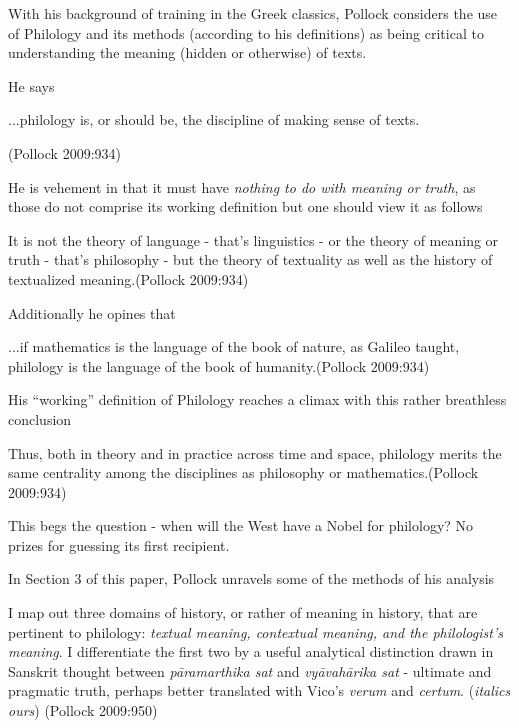 With his background of training in the Greek classics, Pollock considers the use of Philology and its methods (according to his definitions) as being critical to understanding the meaning (hidden or otherwise) of texts.

He says 
\begin{myquote}
...philology is, or should be, the discipline of making sense of texts.

\hfill (Pollock 2009:934)
\end{myquote}

He is vehement in that it must have {{\sl nothing to do with meaning or truth}\relax}, as those do not comprise its working definition but one should view it as follows
\begin{myquote}
It is not the theory of language - that's linguistics - or the theory of meaning or truth - that's philosophy - but the theory of textuality as well as the history of textualized meaning.\hfill (Pollock 2009:934)
\end{myquote}

Additionally he opines that
\begin{myquote}
...if mathematics is the language of the book of nature, as Galileo taught, philology is the language of the book of humanity.\hfill (Pollock 2009:934)
\end{myquote}

His ``working'' definition of Philology reaches a climax with this rather breathless conclusion
\begin{myquote}
Thus, both in theory and in practice across time and space, philology merits the same centrality among the disciplines as philosophy or mathematics.\hfill (Pollock 2009:934)
\end{myquote}

\newpage

This begs the question - when will the West have a Nobel for philology? No prizes for guessing its first recipient.

In Section 3 of this paper, Pollock unravels some of the methods of his analysis
\begin{myquote}
I map out three domains of history, or rather of meaning in history, that are pertinent to philology: {\sl textual meaning, contextual meaning, and the philologist's meaning}. I differentiate the first two by a useful analytical distinction drawn in Sanskrit thought between {\sl pāramarthika sat} and {\sl vyāvahārika sat} -  ultimate and pragmatic truth, perhaps better translated with Vico's {\sl verum} and {\sl certum}. ({\sl italics ours})
\hfill (Pollock 2009:950) 
\end{myquote}

